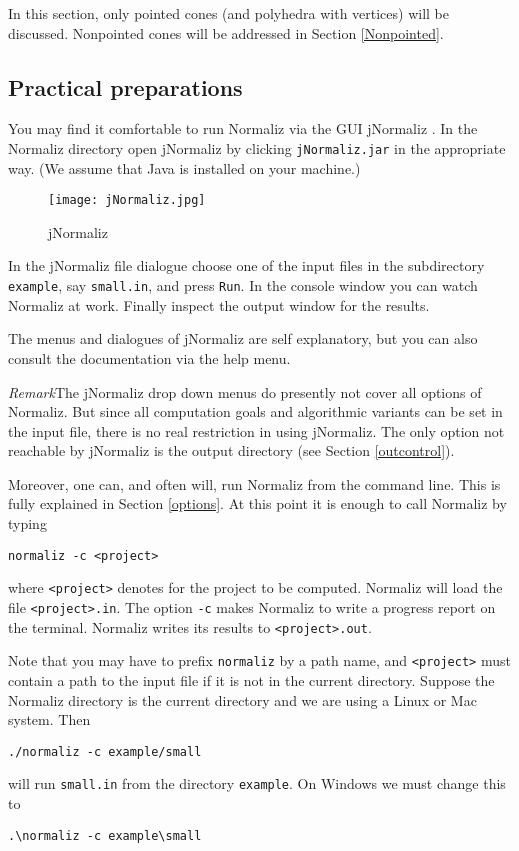 \documentclass[12pt,a4paper]{scrartcl}
\theoremstyle{definition}
\def\ttt{\texttt}
\begin{document}
In this section, only pointed cones (and polyhedra with vertices) will be discussed. Nonpointed cones will be addressed in Section \ref{Nonpointed}. 


\subsection{Practical preparations}

You may find it comfortable to run Normaliz via the GUI jNormaliz \cite{AI}. In the Normaliz directory open jNormaliz by clicking
\ttt{jNormaliz.jar} in the appropriate way. (We assume that
Java is installed on your machine.)
\begin{figure}[bht]
	\centering
	\texttt{[image: jNormaliz.jpg]}\\%
	\caption{jNormaliz}\label{new}
\end{figure}
In the jNormaliz file dialogue choose one of the input files
in the subdirectory \ttt{example}, say \ttt{small.in}, and
press \ttt{Run}. In the console window you can watch Normaliz
at work. Finally inspect the output window for the results.

The menus and dialogues of jNormaliz are self explanatory, but you
can also consult the documentation \cite{AI} via the help menu.

\emph{Remark}\enspace The jNormaliz drop down menus do presently not cover all options of Normaliz. But since all computation goals and algorithmic variants can be set in the input file, there is no real restriction in using jNormaliz. The only option not reachable by jNormaliz is the output directory (see Section \ref{outcontrol}).

Moreover, one can, and often will, run Normaliz from the
command line. This is fully explained in Section \ref{options}. At this point it is enough to call Normaliz by typing
\begin{Verbatim}
normaliz -c <project>
\end{Verbatim}
where \ttt{<project>} denotes for the project to be computed. Normaliz will load the file \ttt{<project>.in}. The option \verb|-c| makes Normaliz to write a progress report on the terminal. Normaliz writes its results to \verb|<project>.out|.

Note that you may have to prefix  \ttt{normaliz} by a path name, and \ttt{<project>} must contain a path to the input file if it is not in the current directory. Suppose the Normaliz directory is the current directory and we are using a Linux or Mac system. Then
\begin{Verbatim}
./normaliz -c example/small
\end{Verbatim}
will run \ttt{small.in} from the directory \ttt{example}. On Windows we must change this to
\begin{Verbatim}
.\normaliz -c example\small
\end{Verbatim}
\end{document}
